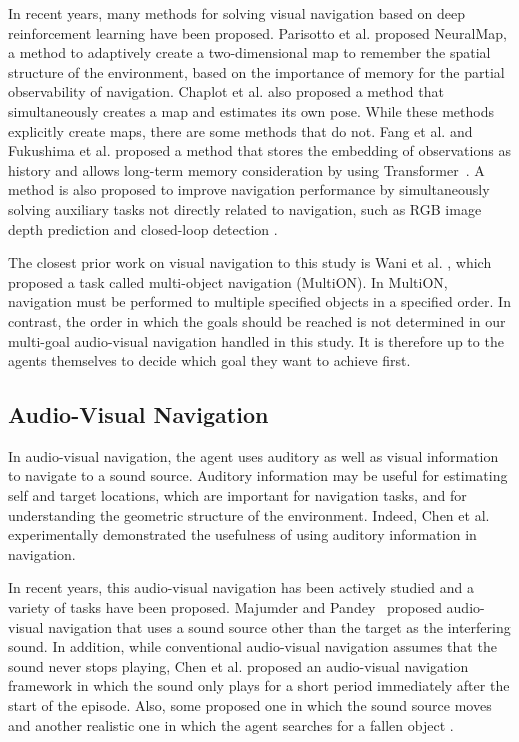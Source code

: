 In recent years, many methods for solving visual navigation based on deep reinforcement learning have been proposed.
Parisotto et al. \cite{DBLP:journals/corr/ParisottoS17} proposed NeuralMap, a method to adaptively create a two-dimensional map to remember the spatial structure of the environment, based on the importance of memory for the partial observability of navigation.
Chaplot et al. \cite{chaplot2019learning, chaplot2020object} also proposed a method that simultaneously creates a map and estimates its own pose.
While these methods explicitly create maps, there are some methods that do not.
Fang et al. \cite{fang2019scene} and Fukushima et al. \cite{9812027} proposed a method that stores the embedding of observations as history and allows long-term memory consideration by using Transformer~\cite{vaswani2017attention}. 
A method is also proposed to improve navigation performance by simultaneously solving auxiliary tasks not directly related to navigation, such as RGB image depth prediction and closed-loop detection \cite{mirowski2017learning, 9370169}.

The closest prior work on visual navigation to this study is Wani et al. \cite{wani2020multion}, which proposed a task called multi-object navigation (MultiON).
In MultiON, navigation must be performed to multiple specified objects in a specified order.
In contrast, the order in which the goals should be reached is not determined in our multi-goal audio-visual navigation handled in this study.
It is therefore up to the agents themselves to decide which goal they want to achieve first.


\subsection{Audio-Visual Navigation}

In audio-visual navigation, the agent uses auditory as well as visual information to navigate to a sound source.
Auditory information may be useful for estimating self and target locations, which are important for navigation tasks, and for understanding the geometric structure of the environment.
Indeed, Chen et al. \cite{chen2020soundspaces} experimentally demonstrated the usefulness of using auditory information in navigation.

In recent years, this audio-visual navigation has been actively studied and a variety of tasks have been proposed.
Majumder and Pandey~\cite{majumdersemantic} proposed audio-visual navigation that uses a sound source other than the target as the interfering sound.
In addition, while conventional audio-visual navigation assumes that the sound never stops playing, Chen et al. \cite{chen2021semantic} proposed an audio-visual navigation framework in which the sound only plays for a short period immediately after the start of the episode.
Also, some proposed one in which the sound source moves \cite{younes2021catch, yu2021sound} and another realistic one in which the agent searches for a fallen object \cite{gan2022finding}.

